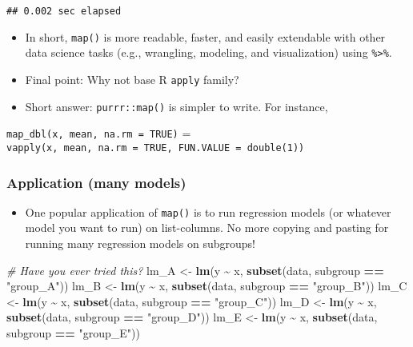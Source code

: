 \documentclass[
]{book}
\newenvironment{Shaded}{\begin{snugshade}}{\end{snugshade}}
\newcommand{\CommentTok}[1]{\textcolor[rgb]{0.56,0.35,0.01}{\textit{#1}}}
\newcommand{\KeywordTok}[1]{\textcolor[rgb]{0.13,0.29,0.53}{\textbf{#1}}}
\newcommand{\NormalTok}[1]{#1}
\newcommand{\OperatorTok}[1]{\textcolor[rgb]{0.81,0.36,0.00}{\textbf{#1}}}
\newcommand{\StringTok}[1]{\textcolor[rgb]{0.31,0.60,0.02}{#1}}
\providecommand{\tightlist}{%
  \setlength{\itemsep}{0pt}\setlength{\parskip}{0pt}}
\begin{document}
\begin{verbatim}
## 0.002 sec elapsed
\end{verbatim}

\begin{itemize}
\item
  In short, \texttt{map()} is more readable, faster, and easily extendable with other data science tasks (e.g., wrangling, modeling, and visualization) using \texttt{\%\textgreater{}\%}.
\item
  Final point: Why not base R \texttt{apply} family?
\item
  Short answer: \texttt{purrr::map()} is simpler to write. For instance,
\end{itemize}

\texttt{map\_dbl(x,\ mean,\ na.rm\ =\ TRUE)} = \texttt{vapply(x,\ mean,\ na.rm\ =\ TRUE,\ FUN.VALUE\ =\ double(1))}

\hypertarget{application-many-models}{%
\subsubsection{Application (many models)}\label{application-many-models}}

\begin{itemize}
\tightlist
\item
  One popular application of \texttt{map()} is to run regression models (or whatever model you want to run) on list-columns. No more copying and pasting for running many regression models on subgroups!
\end{itemize}

\begin{Shaded}
\begin{Highlighting}[]
\CommentTok{\# Have you ever tried this?}
\NormalTok{lm\_A \textless{}{-}}\StringTok{ }\KeywordTok{lm}\NormalTok{(y }\OperatorTok{\textasciitilde{}}\StringTok{ }\NormalTok{x, }\KeywordTok{subset}\NormalTok{(data, subgroup }\OperatorTok{==}\StringTok{ "group\_A"}\NormalTok{))}
\NormalTok{lm\_B \textless{}{-}}\StringTok{ }\KeywordTok{lm}\NormalTok{(y }\OperatorTok{\textasciitilde{}}\StringTok{ }\NormalTok{x, }\KeywordTok{subset}\NormalTok{(data, subgroup }\OperatorTok{==}\StringTok{ "group\_B"}\NormalTok{))}
\NormalTok{lm\_C \textless{}{-}}\StringTok{ }\KeywordTok{lm}\NormalTok{(y }\OperatorTok{\textasciitilde{}}\StringTok{ }\NormalTok{x, }\KeywordTok{subset}\NormalTok{(data, subgroup }\OperatorTok{==}\StringTok{ "group\_C"}\NormalTok{))}
\NormalTok{lm\_D \textless{}{-}}\StringTok{ }\KeywordTok{lm}\NormalTok{(y }\OperatorTok{\textasciitilde{}}\StringTok{ }\NormalTok{x, }\KeywordTok{subset}\NormalTok{(data, subgroup }\OperatorTok{==}\StringTok{ "group\_D"}\NormalTok{))}
\NormalTok{lm\_E \textless{}{-}}\StringTok{ }\KeywordTok{lm}\NormalTok{(y }\OperatorTok{\textasciitilde{}}\StringTok{ }\NormalTok{x, }\KeywordTok{subset}\NormalTok{(data, subgroup }\OperatorTok{==}\StringTok{ "group\_E"}\NormalTok{))}
\end{Highlighting}
\end{Shaded}
\end{document}

